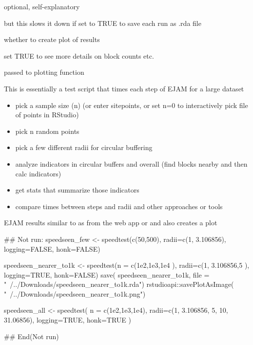 \documentclass[a4paper]{book}
\begin{document}
\begin{Arguments}
\begin{ldescription}
\item[\code{honk\_when\_ready}] optional, self-explanatory

\item[\code{saveoutput}] but this slows it down if set to TRUE to save each run as .rda file

\item[\code{plot}] whether to create plot of results

\item[\code{getblocks\_diagnostics\_shown}] set TRUE to see more details on block counts etc.

\item[\code{...}] passed to plotting function
\end{ldescription}
\end{Arguments}
%
\begin{Details}\relax
This is essentially a test script that times each step of EJAM for a large dataset
\begin{itemize}

\item{} pick a sample size (n) (or enter sitepoints, or set n=0 to interactively pick file of points in RStudio)
\item{} pick n random points
\item{} pick a few different radii for circular buffering
\item{} analyze indicators in circular buffers and overall (find blocks nearby and then calc indicators)
\item{} get stats that summarize those indicators
\item{} compare times between steps and radii and other approaches or tools

\end{itemize}

\end{Details}
%
\begin{Value}
EJAM results similar to as from the web app or  and also creates a plot
\end{Value}
%
\begin{SeeAlso}\relax
{}
\end{SeeAlso}
%
\begin{Examples}
\begin{ExampleCode}
## Not run:  
  speedseen_few <- speedtest(c(50,500), radii=c(1, 3.106856), logging=FALSE, honk=FALSE)
  
  speedseen_nearer_to1k <- speedtest(n = c(1e2,1e3,1e4 ), radii=c(1, 3.106856,5 ),
    logging=TRUE, honk=FALSE)
  save( speedseen_nearer_to1k, file = "~/../Downloads/speedseen_nearer_to1k.rda")
  rstudioapi::savePlotAsImage(        "~/../Downloads/speedseen_nearer_to1k.png")
  
  speedseen_all <- speedtest(
    n = c(1e2,1e3,1e4), 
    radii=c(1, 3.106856, 5, 10, 31.06856), 
    logging=TRUE, honk=TRUE
  )
 
## End(Not run)
\end{ExampleCode}
\end{Examples}
\end{document}
